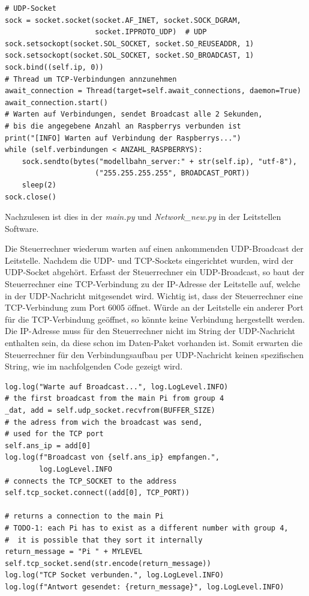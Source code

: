 \documentclass{article}
\begin{document}
\begin{verbatim}
# UDP-Socket
sock = socket.socket(socket.AF_INET, socket.SOCK_DGRAM,
                     socket.IPPROTO_UDP)  # UDP
sock.setsockopt(socket.SOL_SOCKET, socket.SO_REUSEADDR, 1)
sock.setsockopt(socket.SOL_SOCKET, socket.SO_BROADCAST, 1)
sock.bind((self.ip, 0))
# Thread um TCP-Verbindungen annzunehmen
await_connection = Thread(target=self.await_connections, daemon=True)
await_connection.start()
# Warten auf Verbindungen, sendet Broadcast alle 2 Sekunden,
# bis die angegebene Anzahl an Raspberrys verbunden ist
print("[INFO] Warten auf Verbindung der Raspberrys...")
while (self.verbindungen < ANZAHL_RASPBERRYS):
    sock.sendto(bytes("modellbahn_server:" + str(self.ip), "utf-8"),
                     ("255.255.255.255", BROADCAST_PORT))
    sleep(2)
sock.close()
\end{verbatim}

Nachzulesen ist dies in der \textit{main.py} und \textit{Network\_new.py} in der Leitstellen Software.

Die Steuerrechner wiederum warten auf einen ankommenden UDP-Broadcast der Leitstelle.
Nachdem die UDP- und TCP-Sockets eingerichtet wurden, wird der UDP-Socket abgehört.
Erfasst der Steuerrechner ein UDP-Broadcast, so baut der Steuerrechner eine TCP-Verbindung zu der IP-Adresse der Leitstelle auf, welche in der UDP-Nachricht mitgesendet wird.
Wichtig ist, dass der Steuerrechner eine TCP-Verbindung zum Port 6005 öffnet.
Würde an der Leitstelle ein anderer Port für die TCP-Verbindung geöffnet, so könnte keine Verbindung hergestellt werden.
Die IP-Adresse muss für den Steuerrechner nicht im String der UDP-Nachricht enthalten sein, da diese schon im Daten-Paket vorhanden ist.
Somit erwarten die Steuerrechner für den Verbindungsaufbau per UDP-Nachricht keinen spezifischen String, wie im nachfolgenden Code gezeigt wird.

\begin{verbatim}
log.log("Warte auf Broadcast...", log.LogLevel.INFO)
# the first broadcast from the main Pi from group 4
_dat, add = self.udp_socket.recvfrom(BUFFER_SIZE)
# the adress from wich the broadcast was send,
# used for the TCP port
self.ans_ip = add[0]
log.log(f"Broadcast von {self.ans_ip} empfangen.",
        log.LogLevel.INFO
# connects the TCP_SOCKET to the address
self.tcp_socket.connect((add[0], TCP_PORT))

# returns a connection to the main Pi
# TODO-1: each Pi has to exist as a different number with group 4,
#  it is possible that they sort it internally
return_message = "Pi " + MYLEVEL
self.tcp_socket.send(str.encode(return_message))
log.log("TCP Socket verbunden.", log.LogLevel.INFO)
log.log(f"Antwort gesendet: {return_message}", log.LogLevel.INFO)
\end{verbatim}
\end{document}
